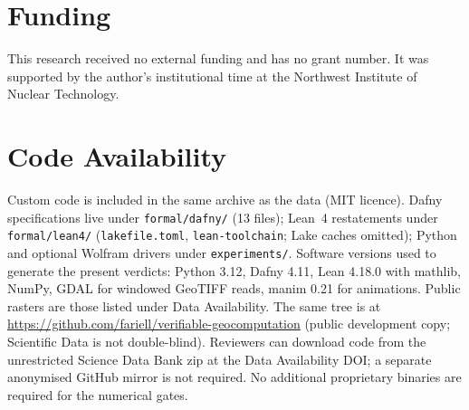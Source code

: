 \documentclass[11pt,a4paper]{article}
\begin{document}
\section{Funding}

This research received no external funding and has no grant number. It
was supported by the author's institutional time at the Northwest
Institute of Nuclear Technology.

\section{Code Availability}

Custom code is included in the same archive as the data (MIT licence).
Dafny specifications live under \texttt{formal/dafny/} (13 files);
Lean~4 restatements under \texttt{formal/lean4/}
(\texttt{lakefile.toml}, \texttt{lean-toolchain}; Lake caches omitted);
Python and optional Wolfram drivers under \texttt{experiments/}.
Software versions used to generate the present verdicts: Python 3.12,
Dafny 4.11, Lean 4.18.0 with mathlib, NumPy, GDAL for windowed GeoTIFF
reads, manim 0.21 for animations. Public rasters are those listed under
Data Availability. The same tree is at
\url{https://github.com/fariell/verifiable-geocomputation}
(public development copy; Scientific Data is not double-blind).
Reviewers can download code from the unrestricted Science Data Bank zip
at the Data Availability DOI; a separate anonymised GitHub mirror is
not required.
No additional proprietary binaries are required for the numerical gates.

\end{document}
